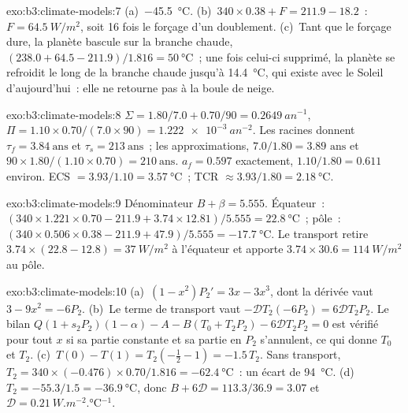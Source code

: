 \begin{solution}{exo:b3:climate-models:7}
(a)~\qty{-45.5}{\celsius}. (b)~$340\times0.38 + F = 211.9 - 18.2$~: $F =
\qty{64.5}{W/m^2}$, soit 16 fois le forçage d'un doublement. (c)~Tant que le
forçage dure, la planète bascule sur la branche chaude, $(238.0 + 64.5 -
211.9)/1.816 = \qty{50}{\celsius}$~; une fois celui-ci supprimé, la planète se refroidit
le long de la branche chaude jusqu'à \qty{14.4}{\celsius}, qui existe avec le Soleil d'aujourd'hui~:
elle ne retourne pas à la boule de neige.
\end{solution}

\begin{solution}{exo:b3:climate-models:8}
$\Sigma = 1.80/7.0 + 0.70/90 = \qty{0.2649}{an^{-1}}$, $\Pi = 1.10\times0.70/
(7.0\times90) = \qty{1.222e-3}{an^{-2}}$. Les racines donnent $\tau_f =
\num{3.84}~\text{ans}$ et $\tau_s = \num{213}~\text{ans}$~; les approximations,
$7.0/1.80 = \num{3.89}\text{ ans}$ et $90\times1.80/(1.10\times0.70) =
\num{210}~\text{ans}$. $a_f = 0.597$ exactement, $1.10/1.80 = 0.611$
environ. ECS $= 3.93/1.10 = \qty{3.57}{\celsius}$~; TCR $\approx
3.93/1.80 = \qty{2.18}{\celsius}$.
\end{solution}

\begin{solution}{exo:b3:climate-models:9}
Dénominateur $B + \beta = \num{5.555}$. Équateur~: $(340\times1.221\times0.70 -
211.9 + 3.74\times12.81)/5.555 = \qty{22.8}{\celsius}$~; pôle~:
$(340\times0.506\times0.38 - 211.9 + 47.9)/5.555 = \qty{-17.7}{\celsius}$.
Le transport retire $3.74\times(22.8 - 12.8) = \qty{37}{W/m^2}$ à
l'équateur et apporte $3.74\times30.6 = \qty{114}{W/m^2}$ au pôle.
\end{solution}

\begin{solution}{exo:b3:climate-models:10}
(a)~$(1 - x^2)P_2' = 3x - 3x^3$, dont la dérivée vaut $3 - 9x^2 = -6P_2$.
(b)~Le terme de transport vaut $-\mathcal D T_2(-6P_2) = 6\mathcal DT_2P_2$.
Le bilan $Q(1 + s_2P_2)(1 - \alpha) - A - B(T_0 + T_2P_2) - 6\mathcal
DT_2P_2 = 0$ est vérifié pour tout $x$ si sa partie constante et sa partie en $P_2$
s'annulent, ce qui donne $T_0$ et $T_2$. (c)~$T(0) - T(1) = T_2(-\tfrac12 - 1)
= -1.5\,T_2$. Sans transport, $T_2 = 340\times(-0.476)\times0.70/1.816 =
\qty{-62.4}{\celsius}$~: un écart de \qty{94}{\celsius}. (d)~$T_2 =
-55.3/1.5 = \qty{-36.9}{\celsius}$, donc $B + 6\mathcal D = 113.3/36.9 =
3.07$ et $\mathcal D = \qty{0.21}{W.m^{-2}.\celsius^{-1}}$.
\end{solution}

